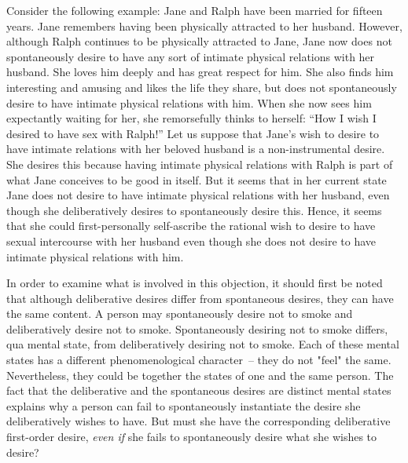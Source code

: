 \documentclass[output=paper]{langscibook}
\begin{document}
Consider the following example: Jane and Ralph have been married for fifteen years. Jane remembers having been physically attracted to her husband. However, although Ralph continues to be physically attracted to Jane, Jane now does not spontaneously desire to have any sort of intimate physical relations with her husband. She loves him deeply and has great respect for him. She also finds him interesting and amusing and likes the life they share, but does not spontaneously desire to have intimate physical relations with him. When she now sees him expectantly waiting for her, she remorsefully thinks to herself: “How I wish I desired to have sex with Ralph!”        
Let us suppose that Jane's wish to desire to have intimate relations with her beloved husband is a non-instrumental desire. She desires this because having intimate physical relations with Ralph is part of what Jane conceives to be good in itself. But it seems that in her current state Jane does not desire to have intimate physical relations with her husband, even though she deliberatively desires to spontaneously desire this. Hence, it seems that she could first-personally self-ascribe the rational wish to desire to have sexual intercourse with her husband even though she does not desire to have intimate physical relations with him. 

In order to examine what is involved in this objection, it should first be noted that although deliberative desires differ from spontaneous desires, they can have the same content. A person may spontaneously desire not to smoke and deliberatively desire not to smoke. Spontaneously desiring not to smoke differs, qua mental state, from deliberatively desiring not to smoke. Each of these mental states has a different phenomenological character~– they do not "feel" the same. Nevertheless, they could be together the states of one and the same person. The fact that the deliberative and the spontaneous desires are distinct mental states explains why a person can fail to spontaneously instantiate the desire she deliberatively wishes to have. But must she have the corresponding deliberative first-order desire, \textit{even if} she fails to spontaneously desire what she wishes to desire? 
\end{document}
